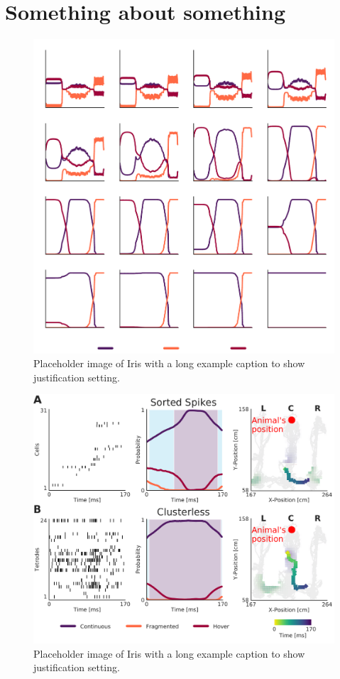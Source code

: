 \documentclass[times, twoside]{zHenriquesLab-StyleBioRxiv}
\begin{document}
\newpage

\captionsetup*{format=largeformat}
\section{Something about something} \label{note:Note1} 
\Blindtext

\begin{figure}%
\centering
\includegraphics[width=0.80\linewidth]{figures/Figure1-supplemental1/Figure1_v1_supplemental1}
\caption{Placeholder image of Iris with a long example caption to show justification setting.}
\label{fig:Figure1-Figure supplement 1}
\end{figure}

\begin{figure}%
\centering
\includegraphics[width=0.80\linewidth]{figures/Figure2-supplemental1/Figure2_v2-supplemental1}
\caption{Placeholder image of Iris with a long example caption to show justification setting.}
\label{fig:Figure2-Figure supplement 1}
\end{figure}
\end{document}
